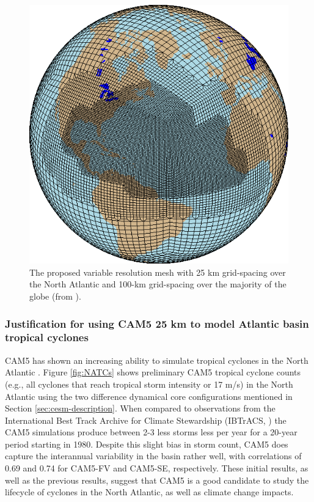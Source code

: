 \documentclass[11pt]{article}
\begin{document}
\begin{figure}[p]
\begin{center}
\includegraphics[width=2.in]{NA_mesh.eps}
\end{center}
\caption{The proposed variable resolution mesh with 25 km grid-spacing over the North Atlantic and 100-km grid-spacing over the majority of the globe (from \citet{Zarzycki2014multidecadal}).} \label{fig:NA_mesh}
\end{figure}

\subsubsection{Justification for using CAM5 25 km to model Atlantic basin tropical cyclones}

CAM5 has shown an increasing ability to simulate tropical cyclones in the North Atlantic \citep{Wehner2014,Wehner2015,Reed2015b}.  Figure \ref{fig:NATCs} shows preliminary CAM5 tropical cyclone counts (e.g., all cyclones that reach tropical storm intensity or 17 m/s) in the North Atlantic using the two difference dynamical core configurations mentioned in Section \ref{sec:cesm-description}. When compared to observations from the International Best Track Archive for Climate Stewardship (IBTrACS, \citet{Knapp2010}) the CAM5 simulations produce between 2-3 less storms less per year for a 20-year period starting in 1980. Despite this slight bias in storm count, CAM5 does capture the interannual variability in the basin rather well, with correlations of 0.69 and 0.74 for CAM5-FV and CAM5-SE, respectively. These initial results, as well as the previous results, suggest that CAM5 is a good candidate to study the lifecycle of cyclones in the North Atlantic, as well as climate change impacts.
\end{document}
